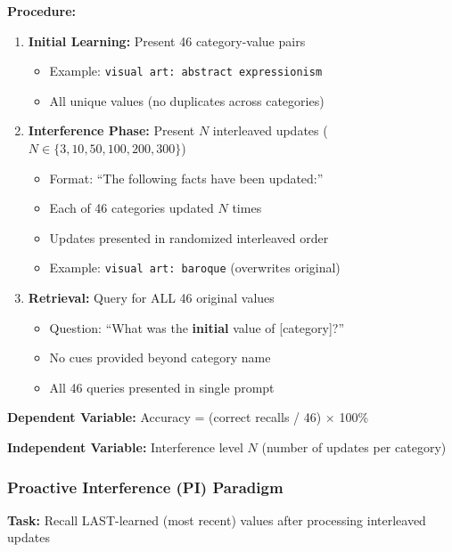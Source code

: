 \documentclass{article}
\begin{document}
\textbf{Procedure:}
\begin{enumerate}
    \item \textbf{Initial Learning:} Present 46 category-value pairs
    \begin{itemize}[itemsep=2pt,topsep=3pt,parsep=0pt]
        \item Example: \texttt{visual art: abstract expressionism}
        \item All unique values (no duplicates across categories)
    \end{itemize}

    \item \textbf{Interference Phase:} Present $N$ interleaved updates ($N \in \{3, 10, 50, 100, 200, 300\}$)
    \begin{itemize}[itemsep=2pt,topsep=3pt,parsep=0pt]
        \item Format: ``The following facts have been updated:''
        \item Each of 46 categories updated $N$ times
        \item Updates presented in randomized interleaved order
        \item Example: \texttt{visual art: baroque} (overwrites original)
    \end{itemize}

    \item \textbf{Retrieval:} Query for ALL 46 original values
    \begin{itemize}[itemsep=2pt,topsep=3pt,parsep=0pt]
        \item Question: ``What was the \textbf{initial} value of [category]?''
        \item No cues provided beyond category name
        \item All 46 queries presented in single prompt
    \end{itemize}
\end{enumerate}

\textbf{Dependent Variable:} Accuracy = (correct recalls / 46) $\times$ 100\%

\textbf{Independent Variable:} Interference level $N$ (number of updates per category)

\subsubsection{Proactive Interference (PI) Paradigm}

\textbf{Task:} Recall LAST-learned (most recent) values after processing interleaved updates
\end{document}
